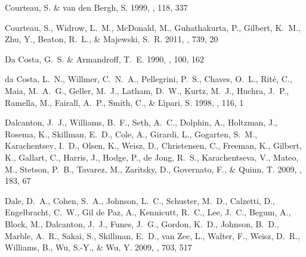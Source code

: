 \documentclass[manuscript]{aastex}
\begin{document}
\begin{thebibliography}{381}
{Courteau}, S. \& {van den Bergh}, S. 1999, \aj, 118, 337

{Courteau}, S., {Widrow}, L.~M., {McDonald}, M., {Guhathakurta}, P., {Gilbert},
  K.~M., {Zhu}, Y., {Beaton}, R.~L., \& {Majewski}, S.~R. 2011, \apj, 739, 20

{Da Costa}, G.~S. \& {Armandroff}, T.~E. 1990, \aj, 100, 162

{da Costa}, L.~N., {Willmer}, C.~N.~A., {Pellegrini}, P.~S., {Chaves}, O.~L.,
  {Rit{\'e}}, C., {Maia}, M.~A.~G., {Geller}, M.~J., {Latham}, D.~W., {Kurtz},
  M.~J., {Huchra}, J.~P., {Ramella}, M., {Fairall}, A.~P., {Smith}, C., \&
  {L{\'{\i}}pari}, S. 1998, \aj, 116, 1

{Dalcanton}, J.~J., {Williams}, B.~F., {Seth}, A.~C., {Dolphin}, A.,
  {Holtzman}, J., {Rosema}, K., {Skillman}, E.~D., {Cole}, A., {Girardi}, L.,
  {Gogarten}, S.~M., {Karachentsev}, I.~D., {Olsen}, K., {Weisz}, D.,
  {Christensen}, C., {Freeman}, K., {Gilbert}, K., {Gallart}, C., {Harris}, J.,
  {Hodge}, P., {de Jong}, R.~S., {Karachentseva}, V., {Mateo}, M., {Stetson},
  P.~B., {Tavarez}, M., {Zaritsky}, D., {Governato}, F., \& {Quinn}, T. 2009,
  \apjs, 183, 67

{Dale}, D.~A., {Cohen}, S.~A., {Johnson}, L.~C., {Schuster}, M.~D., {Calzetti},
  D., {Engelbracht}, C.~W., {Gil de Paz}, A., {Kennicutt}, R.~C., {Lee}, J.~C.,
  {Begum}, A., {Block}, M., {Dalcanton}, J.~J., {Funes}, J.~G., {Gordon},
  K.~D., {Johnson}, B.~D., {Marble}, A.~R., {Sakai}, S., {Skillman}, E.~D.,
  {van Zee}, L., {Walter}, F., {Weisz}, D.~R., {Williams}, B., {Wu}, S.-Y., \&
  {Wu}, Y. 2009, \apj, 703, 517


\end{thebibliography}
\end{document}
